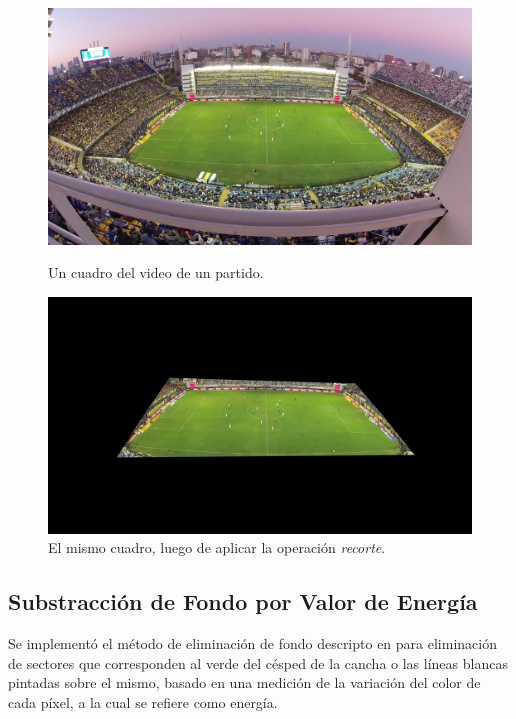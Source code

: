 \begin{figure}[H]
  \centering
    \begin{minipage}[t]{.45\textwidth}
      \includegraphics[width=\linewidth]{./images/Crop_Antes.png}
      \caption{Un cuadro del video de un partido.
      \label{fig:crop-antes}}
    \end{minipage}
    \begin{minipage}[t]{.45\textwidth}
      \centering
      \includegraphics[width=\linewidth]{./images/Crop_Despues.png}
      \caption{El mismo cuadro, luego de aplicar la operación \textit{recorte}.
      \label{fig:crop-despues}}
    \end{minipage}
\end{figure}

\subsection{Substracción de Fondo por Valor de Energía}

Se implementó el método de eliminación de fondo descripto en
\cite{papers-tanos} para eliminación de sectores que corresponden al verde del
césped de la cancha o las líneas blancas pintadas sobre el mismo, basado en una
medición de la variación del color de cada píxel, a la cual se refiere como
energía.

